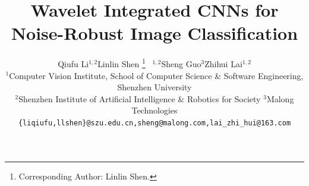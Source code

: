 \documentclass[10pt,twocolumn,letterpaper]{article}
\begin{document}
\title{Wavelet Integrated CNNs for Noise-Robust Image Classification}

\author{
Qiufu Li$^{1,2}$\quad Linlin Shen
\thanks{Corresponding Author: Linlin Shen.}
\ $^{1,2}$\quad Sheng Guo$^3$\quad Zhihui Lai$^{1,2}$\\
$^1$Computer Vision Institute, School of Computer Science \& Software Engineering, Shenzhen University\\
$^2$Shenzhen Institute of Artificial Intelligence \& Robotics for Society\quad
$^3$Malong Technologies \\
{\tt\small \{liqiufu,llshen\}@szu.edu.cn,sheng@malong.com,lai\_zhi\_hui@163.com}
}

\maketitle
\thispagestyle{empty}
\end{document}
